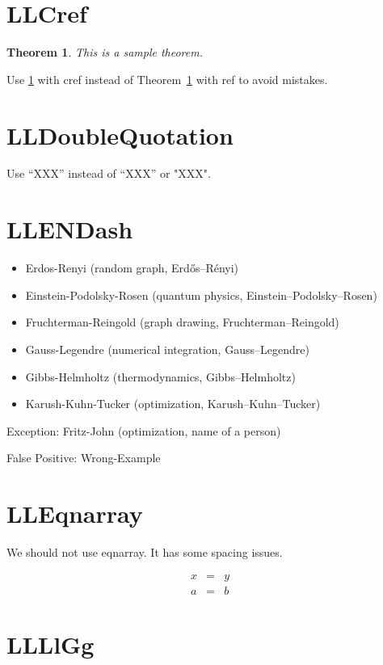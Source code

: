 \documentclass[a4paper, 10pt]{article}
\newtheorem{theorem}{Theorem}
\begin{document}
\section{LLCref}

\begin{theorem}
	\label{thm:sample}
	This is a sample theorem.
\end{theorem}

Use \cref{thm:sample} with cref instead of Theorem~\ref{thm:sample} with ref to avoid mistakes.

\section{LLDoubleQuotation}

Use ``XXX'' instead of “XXX” or "XXX".

\section{LLENDash}

\begin{itemize}
	\item Erdos-Renyi (random graph, Erd\H{o}s--R\'enyi)
	\item Einstein-Podolsky-Rosen (quantum physics, Einstein--Podolsky--Rosen)
	\item Fruchterman-Reingold (graph drawing, Fruchterman--Reingold)
	\item Gauss-Legendre (numerical integration, Gauss--Legendre)
	\item Gibbs-Helmholtz (thermodynamics, Gibbs--Helmholtz)
	\item Karush-Kuhn-Tucker (optimization, Karush--Kuhn--Tucker)
\end{itemize}

Exception: Fritz-John (optimization, name of a person)

False Positive: Wrong-Example

\section{LLEqnarray}

We should not use eqnarray. It has some spacing issues.

\begin{eqnarray}
	x & = & y \\
	a & = & b
\end{eqnarray}

\section{LLLlGg}
\end{document}
